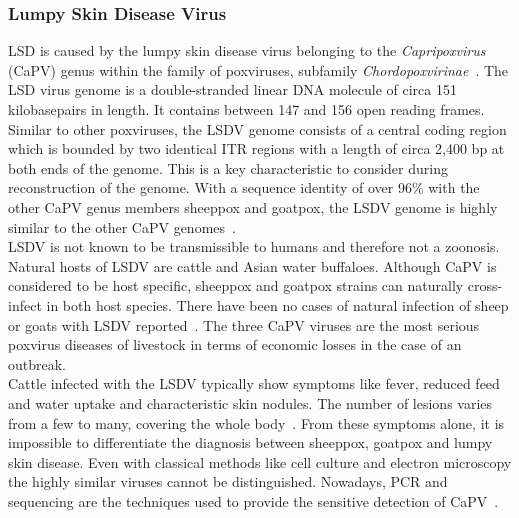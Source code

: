 \subsubsection*{Lumpy Skin Disease Virus}
\ac{LSD} is caused by the lumpy skin disease virus belonging to the \textit{Capripoxvirus} (CaPV) genus within the family of poxviruses, subfamily \textit{Chordopoxvirinae}~\cite{walker2019changes}. The \ac{LSD} virus genome is a double-stranded linear \ac{DNA} molecule of circa 151 kilobasepairs in length. It contains between 147 and 156 open reading frames. Similar to other poxviruses, the \ac{LSDV} genome consists of a central coding region which is bounded by two identical \ac{ITR} regions with a length of circa 2,400 bp at both ends of the genome. This is a key characteristic to consider during reconstruction of the genome. With a sequence identity of over 96\% with the other \acs{CaPV} genus members sheeppox and goatpox, the \ac{LSDV} genome is highly similar to the other \acs{CaPV} genomes~\cite{tulman2001genome}. \\
\ac{LSDV} is not known to be transmissible to humans and therefore not a zoonosis. Natural hosts of \ac{LSDV} are cattle and Asian water buffaloes. Although \acs{CaPV} is considered to be host specific, sheeppox and goatpox strains can naturally cross-infect in both host species. There have been no cases of natural infection of sheep or goats with \ac{LSDV} reported~\cite{namazi2021lumpy}. The three \acs{CaPV} viruses are the most serious poxvirus diseases of livestock in terms of economic losses in the case of an outbreak. \\
Cattle infected with the \ac{LSDV} typically show symptoms like fever, reduced feed and water uptake and characteristic skin nodules. The number of lesions varies from a few to many, covering the whole body~\cite{prozesky1982study}. From these symptoms alone, it is impossible to differentiate the diagnosis between sheeppox, goatpox and lumpy skin disease. Even with classical methods like cell culture and electron microscopy the highly similar viruses cannot be distinguished. Nowadays, \ac{PCR} and sequencing are the techniques used to provide the sensitive detection of \acs{CaPV}~\cite{lafar2020capripoxvirus}.

